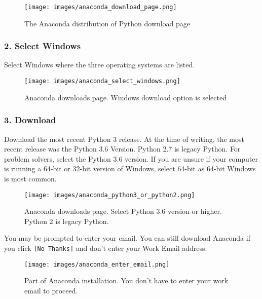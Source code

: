 \documentclass{book}
\makeatletter
\def\maxwidth{\ifdim\Gin@nat@width>\linewidth\linewidth
\else\Gin@nat@width\fi}
\let\Oldincludegraphics\includegraphics
\renewcommand{\includegraphics}[1]{\Oldincludegraphics[width=.8\maxwidth]{#1}}
\newcommand{\passthrough}[1]{#1}
\makeatother
\begin{document}
\begin{figure}
\centering
\texttt{[image: images/anaconda\_download\_page.png]}
\caption{The Anaconda distribution of Python download page}
\end{figure}
    




    
        \hypertarget{select-windows}{%
\subsubsection{2. Select Windows}\label{select-windows}}

Select Windows where the three operating systems are listed.

\begin{figure}
\centering
\texttt{[image: images/anaconda\_select\_windows.png]}
\caption{Anaconda downloads page. Windows download option is selected}
\end{figure}
    




    
        \hypertarget{download}{%
\subsubsection{3. Download}\label{download}}

Download the most recent Python 3 release. At the time of writing, the
most recent release was the Python 3.6 Version. Python 2.7 is legacy
Python. For problem solvers, select the Python 3.6 version. If you are
unsure if your computer is running a 64-bit or 32-bit version of
Windows, select 64-bit as 64-bit Windows is most common.

\begin{figure}
\centering
\texttt{[image: images/anaconda\_python3\_or\_python2.png]}
\caption{Anaconda downloads page. Select Python 3.6 version or higher.
Python 2 is legacy Python.}
\end{figure}

You may be prompted to enter your email. You can still download Anaconda
if you click \passthrough{\lstinline![No Thanks]!} and don't enter your
Work Email address.

\begin{figure}
\centering
\texttt{[image: images/anaconda\_enter\_email.png]}
\caption{Part of Anaconda installation. You don't have to enter your
work email to proceed.}
\end{figure}
\end{document}
